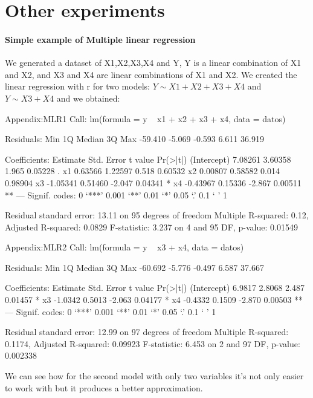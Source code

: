 \section{Other experiments\label{Appendix:Sobras}}
\FloatBarrier
\paragraph{Simple example of Multiple linear regression}
We generated a dataset of X1,X2,X3,X4 and Y, Y is a linear combination of X1 and X2, and X3 and X4 are linear combinations of X1 and X2. We created the linear regression with r for two models: $Y\sim X1+X2+X3+X4$ and $Y\sim X3+X4$ and we obtained:
\begin{textbox}{Appendix:MLR1}{}
Call:
lm(formula = y ~ x1 + x2 + x3 + x4, data = datos)

Residuals:
    Min      1Q  Median      3Q     Max 
-59.410  -5.069  -0.593   6.611  36.919 

Coefficients:
            Estimate Std. Error t value Pr(>|t|)   
(Intercept)  7.08261    3.60358   1.965  0.05228 . 
x1           0.63566    1.22597   0.518  0.60532   
x2           0.00807    0.58582   0.014  0.98904   
x3          -1.05341    0.51460  -2.047  0.04341 * 
x4          -0.43967    0.15336  -2.867  0.00511 **
---
Signif. codes:  0 ‘***’ 0.001 ‘**’ 0.01 ‘*’ 0.05 ‘.’ 0.1 ‘ ’ 1

Residual standard error: 13.11 on 95 degrees of freedom
Multiple R-squared:   0.12,	Adjusted R-squared:  0.0829 
F-statistic: 3.237 on 4 and 95 DF,  p-value: 0.01549

\end{textbox}
\begin{textbox}{Appendix:MLR2}{}
Call:
lm(formula = y ~ x3 + x4, data = datos)

Residuals:
    Min      1Q  Median      3Q     Max 
-60.692  -5.776  -0.497   6.587  37.667 

Coefficients:
            Estimate Std. Error t value Pr(>|t|)   
(Intercept)   6.9817     2.8068   2.487  0.01457 * 
x3           -1.0342     0.5013  -2.063  0.04177 * 
x4           -0.4332     0.1509  -2.870  0.00503 **
---
Signif. codes:  0 ‘***’ 0.001 ‘**’ 0.01 ‘*’ 0.05 ‘.’ 0.1 ‘ ’ 1

Residual standard error: 12.99 on 97 degrees of freedom
Multiple R-squared:  0.1174,	Adjusted R-squared:  0.09923 
F-statistic: 6.453 on 2 and 97 DF,  p-value: 0.002338
\end{textbox}
We can see how for the second model with only two variables it's not only easier to work with but it produces a better approximation.
\FloatBarrier
